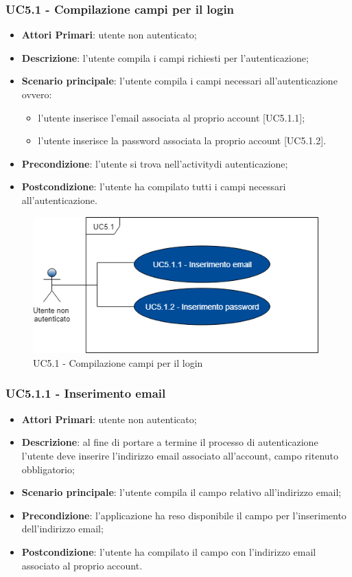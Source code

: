 \subsubsection{UC5.1 - Compilazione campi per il login}
\begin{itemize}
	\item \textbf{Attori Primari}: utente non autenticato;
	\item \textbf{Descrizione}: l'utente compila i campi richiesti per l'autenticazione;
	\item \textbf{Scenario principale}: l'utente compila i campi necessari all'autenticazione ovvero:
		\begin{itemize}
			\item l'utente inserisce l'email associata al proprio account [UC5.1.1];
			\item l'utente inserisce la password associata la proprio account [UC5.1.2].
		\end{itemize}	
	\item \textbf{Precondizione}: l'utente si trova nell'activity\glosp di autenticazione;
	\item \textbf{Postcondizione}: l'utente ha compilato tutti i campi necessari all'autenticazione.	
\end{itemize}
\begin{figure}[h]
	\includegraphics[width=11cm]{res/images/UC5-1Compilazione.png}
	\centering
	\caption{UC5.1 - Compilazione campi per il login}
\end{figure}
\subsubsection{UC5.1.1 - Inserimento email}
\begin{itemize}
	\item \textbf{Attori Primari}: utente non autenticato;
	\item \textbf{Descrizione}: al fine di portare a termine il processo di autenticazione l'utente deve inserire l'indirizzo email associato all'account, campo ritenuto obbligatorio;
	\item \textbf{Scenario principale}: l'utente compila il campo relativo all'indirizzo email;	
	\item \textbf{Precondizione}: l'applicazione ha reso disponibile il campo per l'inserimento dell'indirizzo email;
	\item \textbf{Postcondizione}: l'utente ha compilato il campo con l'indirizzo email associato al proprio account.
\end{itemize}

